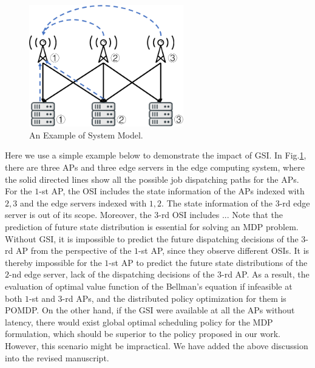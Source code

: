 \documentclass[12pt, onecolumn]{IEEEtran}
\theoremstyle{definition}             %
\theoremstyle{remark}                 %
\theoremstyle{plain}                  %
\newcommand{\delete}[2]{}
\newcommand{\hongyc}[1]{{\leavevmode\color{purple}#1}}
\begin{document}
{        %
        \begin{figure}[htp!]
            \centering
            \includegraphics[width=0.60\textwidth]{osi-example.pdf}
            \caption{An Example of System Model.}
            \label{fig:osi_example}
        \end{figure}
        Here we use a simple example below to demonstrate the impact of GSI.
        In Fig.\ref{fig:osi_example}, there are three APs and three edge servers in the edge computing system, where the solid directed lines show all the possible job dispatching paths for the APs.
        For the $1$-st AP, the OSI includes the state information of the APs indexed with $2,3$ and the edge servers indexed with $1,2$.
        The  state information of the $3$-rd edge server is out of its scope.
        \hongyc{Moreover, the $3$-rd OSI includes ...}
        Note that the prediction of future state distribution is essential for solving an MDP problem.
        Without GSI, it is impossible to predict the future dispatching decisions of the $3$-rd AP from the perspective of the $1$-st AP, since they observe different OSIs.
        It is thereby impossible for the $1$-st AP to predict the future state distributions of the $2$-nd edge server, lack of the dispatching decisions of the $3$-rd AP.
        As a result, the evaluation of optimal value function of the Bellman's equation if infeasible at both $1$-st and $3$-rd APs, and the distributed policy optimization for them is POMDP.
        On the other hand, if the GSI were available at all the APs without latency, there would exist global optimal scheduling policy for the MDP formulation, which should be superior to the policy proposed in our work. However, this scenario might be impractical.
        We have added the above discussion into the revised manuscript.
}
\end{document}
